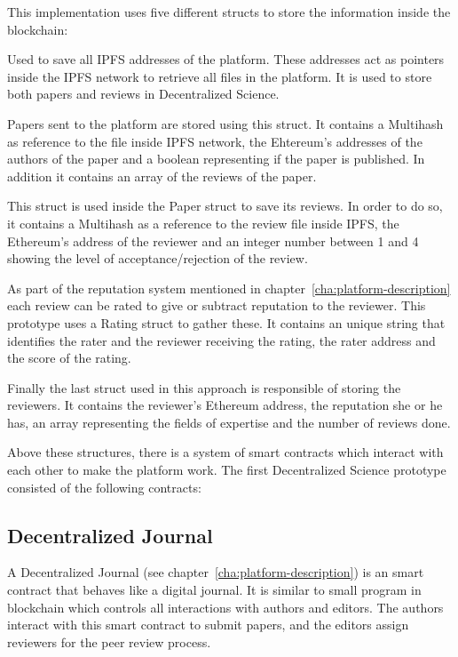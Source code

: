 This implementation uses five different structs to store the information inside
the blockchain:

\begin{itemize}
   Used to save all IPFS addresses of the platform.
  These addresses act as pointers inside the IPFS network to retrieve all files
  in the platform. It is used to store both papers and reviews in Decentralized
  Science.

   Papers sent to the platform are stored using this struct.
  It contains a Multihash as reference to the file inside IPFS network, the
  Ehtereum's addresses of the authors of the paper and a boolean representing if
  the paper is published. In addition it contains an array of the reviews of the
  paper.

   This struct is used inside the Paper struct to save its
  reviews. In order to do so, it contains a Multihash as a reference to the
  review file inside IPFS, the Ethereum's address of the reviewer and an integer
  number between 1 and 4 showing the level of acceptance/rejection of the
  review.

   As part of the reputation system mentioned in
  chapter~\ref{cha:platform-description} each review can be rated to give or
  subtract reputation to the reviewer. This prototype uses a Rating struct to
  gather these. It contains an unique string that identifies the rater and the
  reviewer receiving the rating, the rater address and the score of the rating.

   Finally the last struct used in this approach is responsible
  of storing the reviewers. It contains the reviewer's Ethereum address, the
  reputation she or he has, an array representing the fields of expertise and
  the number of reviews done.
  
\end{itemize}

Above these structures, there is a system of smart contracts which interact with
each other to make the platform work. The first Decentralized Science prototype
consisted of the following contracts:

\subsection*{Decentralized Journal}
\label{sec:decentr-journ}

A Decentralized Journal (see chapter~\ref{cha:platform-description}) is an smart
contract that behaves like a digital journal. It is similar to small program in
blockchain which controls all interactions with authors and editors. The authors
interact with this smart contract to submit papers, and the editors assign
reviewers for the peer review process.

